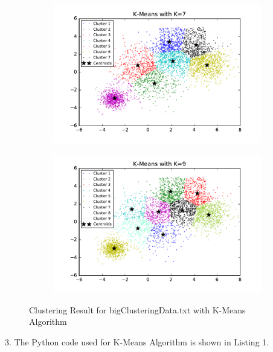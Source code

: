 \begin{description}
\begin{description}
\begin{figure}[!h]
\begin{subfigure}[b]{0.475\textwidth}
        \end{subfigure}
        \begin{subfigure}[b]{0.475\textwidth}   
            \centering 
            \includegraphics[width=\textwidth]{./figures/bigClustering_kMeans_7.pdf}
        \end{subfigure}
        \hfill
        \begin{subfigure}[b]{0.475\textwidth}   
            \centering 
            \includegraphics[width=\textwidth]{./figures/bigClustering_kMeans_9.pdf}
        \end{subfigure}        
        
        \caption{Clustering Result for bigClusteringData.txt with K-Means Algorithm}
        \label{fig:kmean_bigCustering}
\end{figure}

\newpage
\item{3.} The Python code used for K-Means Algorithm is shown in Listing 1.


\end{description}
\end{description}

